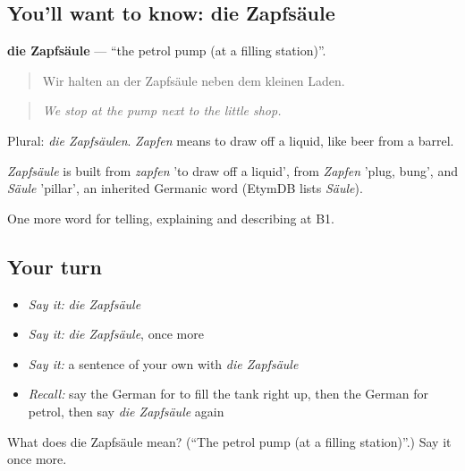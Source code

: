 \subsection*{You'll want to know: die Zapfsäule}
\textbf{die Zapfsäule} — \textquotedblleft{}the petrol pump (at a filling station)\textquotedblright{}.

\begin{quote}
Wir halten an der Zapfsäule neben dem kleinen Laden.
\end{quote}

\begin{quote}
\emph{We stop at the pump next to the little shop.}
\end{quote}

Plural: \emph{die Zapfsäulen}. \emph{Zapfen} means to draw off a liquid, like beer from a barrel.

\begin{cousinweb}
\emph{Zapfsäule} is built from \emph{zapfen} 'to draw off a liquid', from \emph{Zapfen} 'plug, bung', and \emph{Säule} 'pillar', an inherited Germanic word (EtymDB lists \emph{Säule}).
\end{cousinweb}

\begin{grammarlens}[title={What you've built}]
One more word for telling, explaining and describing at B1.
\end{grammarlens}

\subsection*{Your turn}
\begin{itemize}
\raggedright
  \item \emph{Say it:} \emph{die Zapfsäule}
  \item \emph{Say it:} \emph{die Zapfsäule}, once more
  \item \emph{Say it:} a sentence of your own with \emph{die Zapfsäule}
  \item \emph{Recall:} say the German for to fill the tank right up, then the German for petrol, then say \emph{die Zapfsäule} again
\end{itemize}

\begin{tcolorbox}[breakable,colback=teal!4,colframe=teal!35!black,title={Before you move on}]
What does die Zapfsäule mean? (\textquotedblleft{}The petrol pump (at a filling station)\textquotedblright{}.) Say it once more.
\end{tcolorbox}
